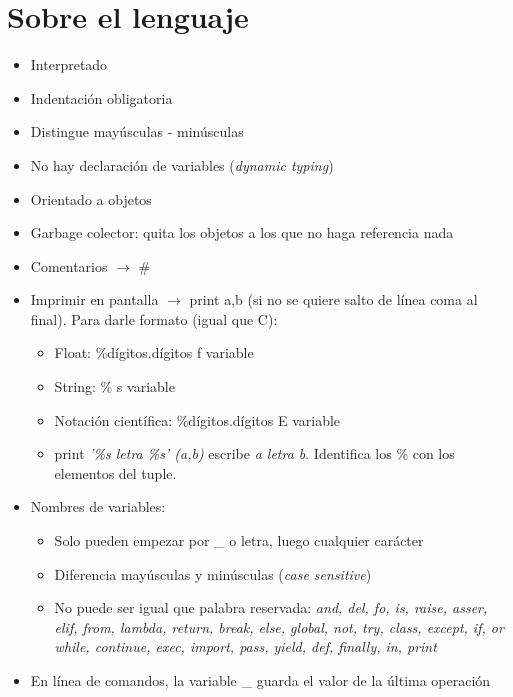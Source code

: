 \section{Sobre el lenguaje} %

	\begin{itemize}
	\item Interpretado
	\item Indentación obligatoria
	\item Distingue mayúsculas - minúsculas
	\item No hay declaración de variables (\textit{dynamic typing})
	\item Orientado a objetos  
	\item Garbage colector: quita los objetos a los que no haga referencia nada
	\item Comentarios $\rightarrow$ \#  %
	\item Imprimir en pantalla $\rightarrow$ print a,b (si no se quiere salto de línea coma al final). Para darle formato (igual que C): 
		\begin{itemize}
		\item Float: \%dígitos.dígitos f variable
		\item String: \% s variable
		\item Notación científica: \%dígitos.dígitos E variable
		\item print \textit{'\%s letra \%s' (a,b)} escribe \textit{a letra b}. Identifica los \% con los elementos del tuple.
		\end{itemize}
	\item Nombres de variables:
		\begin{itemize}
		\item Solo pueden empezar por \_ o letra, luego cualquier carácter
		\item Diferencia mayúsculas y minúsculas (\textit{case sensitive})
		\item No puede ser igual que palabra reservada: \textit{and, del, fo, is, raise, asser, elif, from, lambda, return, break, else, global, not, try, class, except, if, or while, continue, exec, import, pass, yield, def, finally, in, print}
		\end{itemize}
	\item En línea de comandos, la variable \_ guarda el valor de la última operación
	\end{itemize}